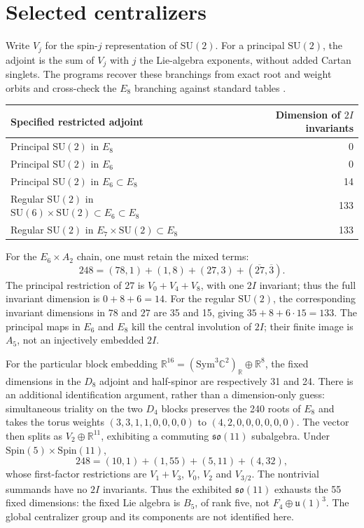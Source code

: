 \documentclass[11pt,a4paper]{amsart}
\newcommand{\C}{\mathbb C}
\newcommand{\R}{\mathbb R}
\newcommand{\SU}{\mathrm{SU}}
\newcommand{\Spin}{\mathrm{Spin}}
\newcommand{\Sym}{\mathrm{Sym}}
\begin{document}
\section{Selected centralizers}
Write $V_j$ for the spin-$j$ representation of $\SU(2)$.
For a principal $\SU(2)$, the adjoint is the sum of $V_j$ with $j$ the
Lie-algebra exponents, without added Cartan singlets. The programs recover
these branchings from exact root and weight orbits and cross-check the
$E_8$ branching against standard tables \cite{SageBranching}.
\begin{center}
\begin{tabular}{lr}
\toprule
Specified restricted adjoint & Dimension of $2I$ invariants\\
\midrule
Principal $\SU(2)$ in $E_8$ & 0\\
Principal $\SU(2)$ in $E_6$ & 0\\
Principal $\SU(2)$ in $E_6\subset E_8$ & 14\\
Regular $\SU(2)$ in $\SU(6)\times\SU(2)\subset E_6\subset E_8$ & 133\\
Regular $\SU(2)$ in $E_7\times\SU(2)\subset E_8$ & 133\\
\bottomrule
\end{tabular}
\end{center}
For the $E_6\times A_2$ chain, one must retain the mixed terms:
\[
248=(78,1)+(1,8)+(27,3)+(\overline{27},\overline3).
\]
The principal restriction of $27$ is $V_0+V_4+V_8$, with one $2I$ invariant;
thus the full invariant dimension is $0+8+6=14$.
For the regular $\SU(2)$, the corresponding invariant dimensions in $78$
and $27$ are 35 and 15, giving $35+8+6\cdot15=133$.
The principal maps in $E_6$ and $E_8$ kill the central involution of $2I$;
their finite image is $A_5$, not an injectively embedded $2I$.

For the particular block embedding
$\R^{16}=(\Sym^3\C^2)_{\R}\oplus\R^8$, the fixed dimensions in the
$D_8$ adjoint and half-spinor are respectively 31 and 24. There is an
additional identification argument, rather than a dimension-only guess:
simultaneous triality on the two $D_4$ blocks preserves the 240 roots of
$E_8$ and takes the torus weights
$(3,3,1,1,0,0,0,0)$ to $(4,2,0,0,0,0,0,0)$.
The vector then splits as $V_2\oplus\R^{11}$, exhibiting a commuting
$\mathfrak{so}(11)$ subalgebra. Under $\Spin(5)\times\Spin(11)$,
\[
248=(10,1)+(1,55)+(5,11)+(4,32),
\]
whose first-factor restrictions are $V_1+V_3$, $V_0$, $V_2$ and $V_{3/2}$.
The nontrivial summands have no $2I$ invariants. Thus the exhibited
$\mathfrak{so}(11)$ exhausts the 55 fixed dimensions: the fixed Lie algebra
is $B_5$, of rank five, not $F_4\oplus\mathfrak u(1)^3$.
The global centralizer group and its components are not identified here.
\end{document}
